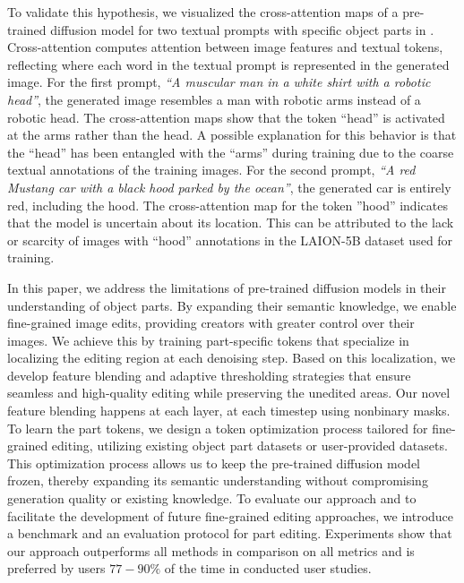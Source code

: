 To validate this hypothesis, we visualized the cross-attention maps of a pre-trained diffusion model for two textual prompts with specific object parts in .
Cross-attention computes attention between image features and textual tokens, reflecting where each word in the textual prompt is represented in the generated image.
For the first prompt, \emph{``A muscular man in a white shirt with a robotic head''}, the generated image resembles a man with robotic arms instead of a robotic head.
The cross-attention maps show that the token ``head'' is activated at the arms rather than the head. 
A possible explanation for this behavior is that the ``head'' has been entangled with the ``arms'' during training due to the coarse textual annotations of the training images.
For the second prompt, \emph{``A red Mustang car with a black hood parked by the ocean''}, the generated car is entirely red, including the hood.
The cross-attention map for the token ''hood'' indicates that the model is uncertain about its location.
This can be attributed to the lack or scarcity of images with ``hood'' annotations in the LAION-5B dataset used for training.


In this paper, we address the limitations of pre-trained diffusion models in their understanding of object parts. 
By expanding their semantic knowledge, we enable fine-grained image edits, providing creators with greater control over their images.
We achieve this by training part-specific tokens that specialize in localizing the editing region at each denoising step.
Based on this localization, we develop feature blending and adaptive thresholding strategies that ensure seamless and high-quality editing while preserving the unedited areas. Our novel feature blending happens at each layer, at each timestep using nonbinary masks.
To learn the part tokens, we design a token optimization process \citep{zhou2022learning}  tailored for fine-grained editing, utilizing existing object part datasets \citep{pascalpart,he2022partimagenet} or user-provided datasets.
This optimization process allows us to keep the pre-trained diffusion model frozen, thereby expanding its semantic understanding without compromising generation quality or existing knowledge.
To evaluate our approach and to facilitate the development of future fine-grained editing approaches, we introduce a benchmark and an evaluation protocol for part editing.
Experiments show that our approach outperforms all methods in comparison on all metrics and is preferred by users $77-90\%$ of the time in conducted user studies.
